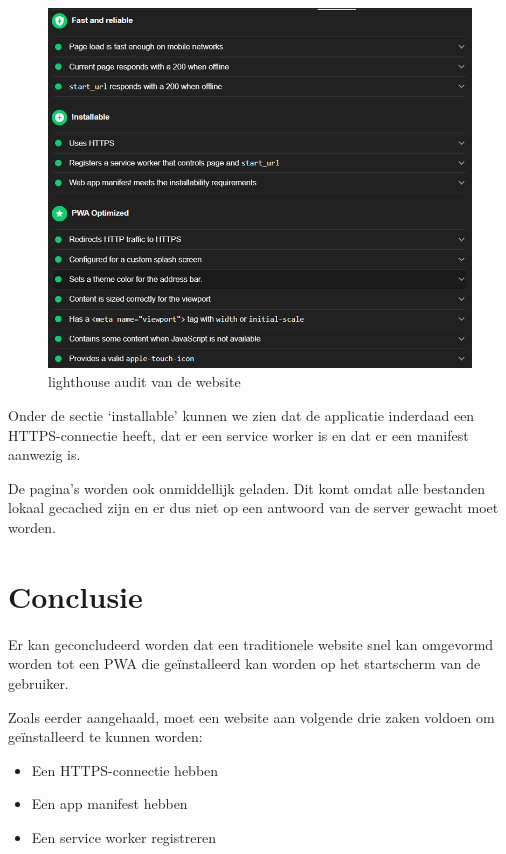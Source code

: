 	\begin{figure}[H]
		\centering
		\includegraphics[width=150mm]{./img/lighthouse_dart.png}{}
		\caption{lighthouse audit van de website}
	\end{figure}

	Onder de sectie ‘installable’ kunnen we zien dat de applicatie inderdaad een HTTPS-connectie heeft, dat er een service worker is en dat er een manifest aanwezig is.
	
	De pagina's worden ook onmiddellijk geladen. Dit komt omdat alle bestanden lokaal gecached zijn en er dus niet op een antwoord van de server gewacht moet worden.

\newpage
\section{Conclusie}

	Er kan geconcludeerd worden dat een traditionele website snel kan omgevormd worden tot een PWA die geïnstalleerd kan worden op het startscherm van de gebruiker. 
	
	Zoals eerder aangehaald, moet een website aan volgende drie zaken voldoen om geïnstalleerd te kunnen worden:
	\begin{itemize}
		\item Een HTTPS-connectie hebben
		\item Een app manifest hebben
		\item Een service worker registreren
	\end{itemize}	
	
